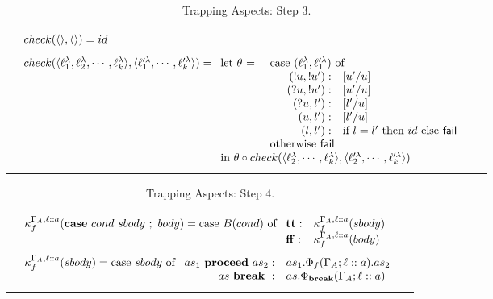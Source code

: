 \documentclass[a4paper]{llncs}
\makeatletter
\newcommand{\YZl}{l}
\newcommand{\Fail}{{\sf fail}}
\newcommand{\Lett}{\ell'^\lambda}
\newcommand{\Case}{{\bf case}}
\newcommand{\TT}{{\bf tt}}
\newcommand{\FF}{{\bf ff}}
\newenvironment{ARRAY}[1]{%
  \begin{tabular*}{\textwidth}{@{\extracolsep{\fill}}c@{}c@{}c}
  \hline
  &&\\[-5pt]
  &\begin{math}\begin{array}{@{} #1 @{}}
}
{ \end{array}\end{math}&\\
  &&\\[-5pt]
  \hline
  \end{tabular*}
}
\makeatother
\begin{document}
\vspace*{-1cm}
\begin{table}[h]
\begin{ARRAY}{l}
check(\langle\rangle,\langle\rangle) = id\\[2ex]
check(\langle \ell_1^\lambda,\ell_2^\lambda,\cdots, \ell_k^\lambda
\rangle,\langle \ell '^{\lambda}_1,\cdots,\ell '^{\lambda}_k \rangle) = 
\begin{array}[t]{ll}
\hbox{let $\theta$ = } & \hbox{case $(\ell_1^\lambda,\ell '^{\lambda}_1)$ of}\\
& \begin{array}{rl}
  \quad(!u,!u'): & [u'/u]\\
  \quad(?u,!u'): & [u'/u]\\
  \quad(?u,\YZl'): & [\YZl'/u]\\
  \quad(u,\YZl'): & [\YZl'/u]\\
  \quad(\YZl,\YZl'): &\hbox{if $\YZl=\YZl'$ then
       $id$ else \Fail}
  \end{array}
\\
&\hbox{otherwise \Fail}
\\
\multicolumn{2}{l}{ \hbox{in } \theta \circ check(\langle
\ell_2^\lambda,\cdots, \ell_k^\lambda \rangle,\langle \ell '^{\lambda}_2,\cdots,
\ell '^{\lambda}_k
\rangle) }
\end{array}
\end{ARRAY}
\caption{Trapping Aspects: Step 3.}
\label{tab:trapping_aspects_check}
\end{table}
\begin{table}[t]
\begin{ARRAY}{l}
\kappa_f^{\Gamma_A,\ell :: a}(\Case \ cond \ sbody \ ; \ body) = 
\hbox{case $B(cond)$ of}\ \begin{array}[t]{l@{\quad}l}
\TT: & \kappa_f^{\Gamma_A,\ell :: a}(sbody) \\
\FF: & \kappa_f^{\Gamma_A,\ell :: a}(body)
\end{array}
\\[5ex]
\kappa_f^{\Gamma_A,\ell :: a}(sbody)= 
 \hbox{case $sbody$ of}\
 \begin{array}[t]{rl}
 as_1\ \mathbf{proceed\ } as_2: &
as_1.\Phi_f(\Gamma_A;\ell :: a).as_2
\\
\qquad as \mathbf{\ break\ }: &
as.\Phi_{\mathbf{break}}(\Gamma_A;\ell :: a)
\end{array}
\end{ARRAY}
\caption{Trapping Aspects: Step $4$.} \label{tab:trapping_aspects_K}
\end{table}
\end{document}
